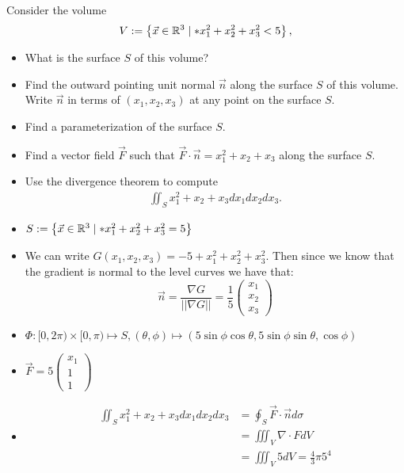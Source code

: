 \documentclass[11pt]{article}
\begin{document}




\begin{exercise} %
    Consider the volume 
    \begin{align}
     V := \left\{ \vec x \in \bbR^3 \suchthat* x_1^2 + x_2^2 + x_3^2 < 5 \right\},
    \end{align}
    \begin{itemize}
     \item
     What is the surface $S$ of this volume?
     \item 
     Find the outward pointing unit normal $\vec n$ along the surface $S$ of this volume. Write $\vec n$ in terms of $(x_1,x_2,x_3)$ at any point on the surface $S$. 
     \item
     Find a parameterization of the surface $S$.
     \item
     Find a vector field $\vec F$ such that $\vec F \cdot \vec n = x_1^2 + x_2 + x_3$ along the surface $S$.
     \item 
     Use the divergence theorem to compute 
     \begin{align}
        \iint_{S} x_1^2 + x_2 + x_3 dx_1 dx_2 dx_3.
     \end{align}
    \end{itemize}
\end{exercise}
\begin{solution}     
    \begin{itemize}
     \item $S := \left\{ \vec x \in \bbR^3 \suchthat* x_1^2 + x_2^2 + x_3^2 = 5 \right\}$
     \item We can write $G(x_1,x_2,x_3) = -5 + x_1^2 + x_2^2 + x_3^2$. Then since we know that the gradient is normal to the level curves we have that:
$$
\vec{n} = \frac{\nabla G}{||\nabla G||} = \frac{1}{5}\begin{pmatrix}
x_1\\x_2\\x_3
\end{pmatrix}
$$
     \item $\Phi: [0,2\pi)\times[0,\pi) \mapsto S, (\theta,\phi) \mapsto (5\sin\phi\cos\theta, 5\sin\phi\sin\theta,\cos\phi)$
     \item $\vec{F} = 5\begin{pmatrix}x_1\\1\\1\end{pmatrix}$
     \item \begin{align*}
        \iint_{S} x_1^2 + x_2 + x_3 dx_1 dx_2 dx_3 & = \oint_{S} \vec{F}\cdot\vec{n} d\sigma \\
		& = \iiint_V \nabla \cdot F dV\\
		& = \iiint_V 5 dV = \frac{4}{3}\pi5^4\\
     \end{align*}
    \end{itemize}
\end{solution}
\end{document}
